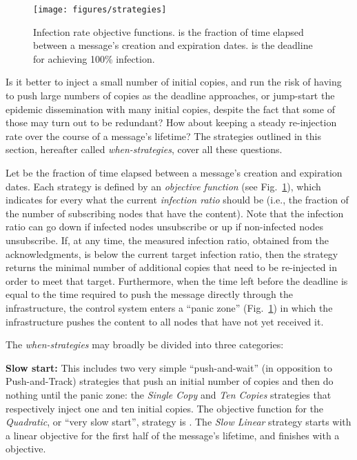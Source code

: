 \documentclass[preprint]{elsarticle}
\begin{document}
\begin{figure}
  \centering
  \texttt{[image: figures/strategies]}
  \caption{Infection rate objective functions.  is the fraction of time elapsed between a message's creation and expiration dates.  is the deadline for achieving 100\% infection.}
  \label{fig:objective_functions}
\end{figure}

Is it better to inject a small number of initial copies, and run the risk of having to push large numbers of copies as the deadline approaches, or jump-start the epidemic dissemination with many initial copies, despite the fact that some of those may turn out to be redundant? How about keeping a steady re-injection rate over the course of a message's lifetime? The strategies outlined in this section, hereafter called \textit{when-strategies}, cover all these questions.

Let  be the fraction of time elapsed between a message's creation and expiration dates. Each strategy is defined by an \textit{objective function} (see Fig.~\ref{fig:objective_functions}), which indicates for every  what the current \textit{infection ratio} should be (i.e., the fraction of the number of subscribing nodes that have the content). Note that the infection ratio can go down if infected nodes unsubscribe or up if non-infected nodes unsubscribe. If, at any time, the measured infection ratio, obtained from the acknowledgments, is below the current target infection ratio, then the strategy returns the minimal number of additional copies that need to be re-injected in order to meet that target. Furthermore, when the time left before the deadline is equal to the time required to push the message directly through the infrastructure, the control system enters a ``panic zone'' (Fig.~\ref{fig:objective_functions}) in which the infrastructure pushes the content to all nodes that have not yet received it.

The \textit{when-strategies} may broadly be divided into three categories:

\smallskip\noindent\textbf{Slow start:} This includes two very simple ``push-and-wait'' (in opposition to Push-and-Track) strategies that push an initial number of copies and then do nothing until the panic zone: the \textit{Single Copy} and \textit{Ten Copies} strategies that respectively inject one and ten initial copies. The objective function for the \textit{Quadratic}, or ``very slow start'', strategy is . The \textit{Slow Linear} strategy starts with a  linear objective for the first half of the message's lifetime, and finishes with a  objective.
\end{document}

